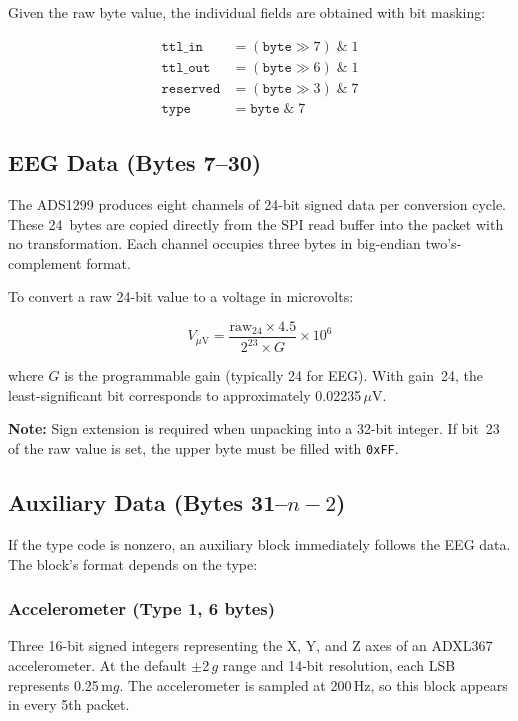 \documentclass[11pt,a4paper]{article}
\newcommand{\hexval}[1]{\texttt{0x#1}}
\newcommand{\notebox}[1]{\par\medskip\noindent\colorbox{backgray}{\parbox{\dimexpr\linewidth-2\fboxsep}{\textbf{Note:} #1}}\medskip}
\begin{document}
Given the raw byte value, the individual fields are obtained with bit masking:

\begin{align}
\texttt{ttl\_in}  &= (\texttt{byte} \gg 7) \;\&\; 1  \nonumber\\
\texttt{ttl\_out} &= (\texttt{byte} \gg 6) \;\&\; 1  \nonumber\\
\texttt{reserved} &= (\texttt{byte} \gg 3) \;\&\; 7  \nonumber\\
\texttt{type}     &= \texttt{byte} \;\&\; 7           \nonumber
\end{align}

\subsection{EEG Data (Bytes 7--30)}

The ADS1299 produces eight channels of 24-bit signed data per conversion cycle.  These 24~bytes are copied directly from the SPI read buffer into the packet with no transformation.  Each channel occupies three bytes in big-endian two's-complement format.

To convert a raw 24-bit value to a voltage in microvolts:

\[
V_{\mu\text{V}} = \frac{\text{raw}_{24} \times 4.5}{2^{23} \times G} \times 10^{6}
\]

where $G$ is the programmable gain (typically 24 for EEG).  With gain~24, the least-significant bit corresponds to approximately 0.02235\,$\mu$V.

\notebox{Sign extension is required when unpacking into a 32-bit integer.  If bit~23 of the raw value is set, the upper byte must be filled with \hexval{FF}.}

\subsection{Auxiliary Data (Bytes 31--$n{-}2$)}

If the type code is nonzero, an auxiliary block immediately follows the EEG data.  The block's format depends on the type:

\subsubsection{Accelerometer (Type 1, 6 bytes)}

Three 16-bit signed integers representing the X, Y, and Z axes of an ADXL367 accelerometer.  At the default $\pm$2\,$g$ range and 14-bit resolution, each LSB represents 0.25\,m$g$.  The accelerometer is sampled at 200\,Hz, so this block appears in every 5th packet.
\end{document}
